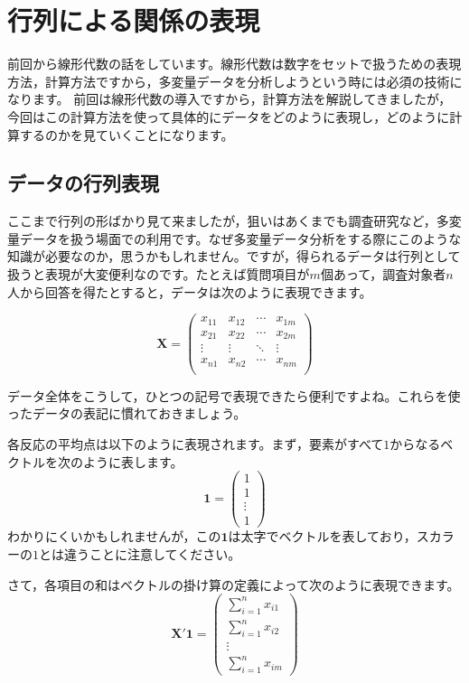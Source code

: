 \documentclass{ltjsbook}
\begin{document}
\chapter{行列による関係の表現}
\label{x07_matrixModel}
前回から線形代数の話をしています。線形代数は数字をセットで扱うための表現方法，計算方法ですから，多変量データを分析しようという時には必須の技術になります。
前回は線形代数の導入ですから，計算方法を解説してきましたが，今回はこの計算方法を使って具体的にデータをどのように表現し，どのように計算するのかを見ていくことになります。

\section{データの行列表現}

ここまで行列の形ばかり見て来ましたが，狙いはあくまでも調査研究など，多変量データを扱う場面での利用です。なぜ多変量データ分析をする際にこのような知識が必要なのか，思うかもしれません。ですが，得られるデータは行列として扱うと表現が大変便利なのです。たとえば質問項目が$m$個あって，調査対象者$n$人から回答を得たとすると，データは次のように表現できます。

\[
	\bm{X}=
	\begin{pmatrix}
		x_{11} & x_{12} & \cdots & x_{1m} \\
		x_{21} & x_{22} & \cdots & x_{2m} \\
		\vdots & \vdots & \ddots & \vdots \\
		x_{n1} & x_{n2} & \cdots & x_{nm} \\
	\end{pmatrix}
\]

データ全体をこうして，ひとつの記号で表現できたら便利ですよね。これらを使ったデータの表記に慣れておきましょう。

各反応の平均点は以下のように表現されます。まず，要素がすべて$1$からなるベクトルを次のように表します。
\[ \bm{1}=\begin{pmatrix} 1 \\ 1 \\ \vdots \\1 \end{pmatrix} \]
わかりにくいかもしれませんが，この$\bm{1}$は太字でベクトルを表しており，スカラーの$1$とは違うことに注意してください。

さて，各項目の和はベクトルの掛け算の定義によって次のように表現できます。
\[ \bm{X}' \bm{1} = \begin{pmatrix} \sum_{i=1}^{n} x_{i1} \\ \sum_{i=1}^{n} x_{i2} \\ \vdots \\ \sum_{i=1}^{n} x_{im} \end{pmatrix} \]
\end{document}
